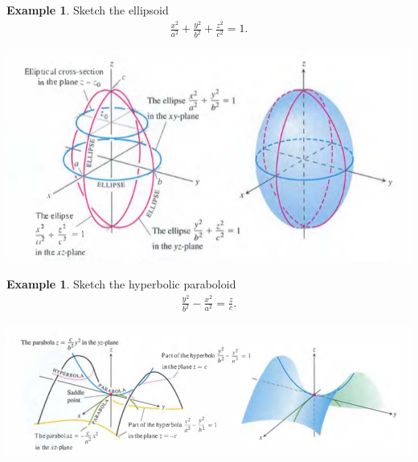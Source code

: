 \documentclass[12pt, letter]{article}
\theoremstyle{plain}
\numberwithin{theorem}{section}
\theoremstyle{definition}
\newtheorem{example}[theorem]{Example}
\begin{document}
\bigskip

\hrulefill

\bigskip

\begin{example}
Sketch the ellipsoid
\begin{align*}
\frac{x^2}{a^2} + \frac{y^2}{b^2} + \frac{z^2}{c^2} = 1.
\end{align*}

\bigskip

\begin{center}
\includegraphics[scale=0.7]{m1_f24}
\end{center}
\end{example}

\bigskip

\hrulefill

\bigskip

\begin{example}
Sketch the hyperbolic paraboloid
\begin{align*}
\frac{y^2}{b^2} - \frac{x^2}{a^2} = \frac{z}{c}.
\end{align*}

\bigskip

\begin{center}
\includegraphics[scale=0.55]{m1_f25}
\end{center}
\end{example}

\newpage
\end{document}
